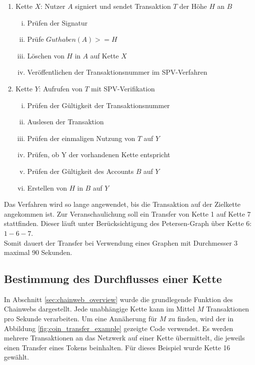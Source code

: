 \begin{enumerate}
 \item Kette $X$: Nutzer $A$ signiert und sendet Transaktion $T$ der Höhe $H$ an $B$
    \begin{enumerate}[i)]
        \item Prüfen der Signatur
        \item Prüfe $Guthaben(A) >= H$
        \item Löschen von $H$ in $A$ auf Kette $X$
        \item Veröffentlichen der Transaktionsnummer im SPV-Verfahren
    \end{enumerate}
 \item Kette $Y$: Aufrufen von $T$ mit SPV-Verifikation
    \begin{enumerate}[i)]
        \item Prüfen der Gültigkeit der Transaktionsnummer
        \item Auslesen der Transaktion 
        \item Prüfen der einmaligen Nutzung von $T$ auf $Y$
        \item Prüfen, ob Y der vorhandenen Kette entspricht
        \item Prüfen der Gültigkeit des Accounts $B$ auf $Y$
        \item Erstellen von $H$ in $B$ auf $Y$
    \end{enumerate}
\end{enumerate}
Das Verfahren wird so lange angewendet, bis die Transaktion auf der Zielkette angekommen ist. Zur Veranschaulichung soll ein Transfer von Kette 1 auf Kette 7 stattfinden. Dieser läuft unter Berücksichtigung des Petersen-Graph über Kette 6: $1-6-7$.
\\
Somit dauert der Transfer bei Verwendung eines Graphen mit Durchmesser 3 maximal 90 Sekunden.

\subsection{Bestimmung des Durchflusses einer Kette}
\label{sec:durchfluss_kette}
In Abschnitt \eqref{sec:chainweb_overview} wurde die grundlegende Funktion des Chainwebs dargestellt. Jede unabhängige Kette kann im Mittel $M$ Transaktionen pro Sekunde verarbeiten. Um eine Annäherung für $M$ zu finden, wird der in Abbildung \eqref{fig:coin_transfer_example} gezeigte Code verwendet. Es werden mehrere Transaktionen an das Netzwerk auf einer Kette übermittelt, die jeweils einen Transfer eines Tokens beinhalten. Für dieses Beispiel wurde Kette 16 gewählt.

